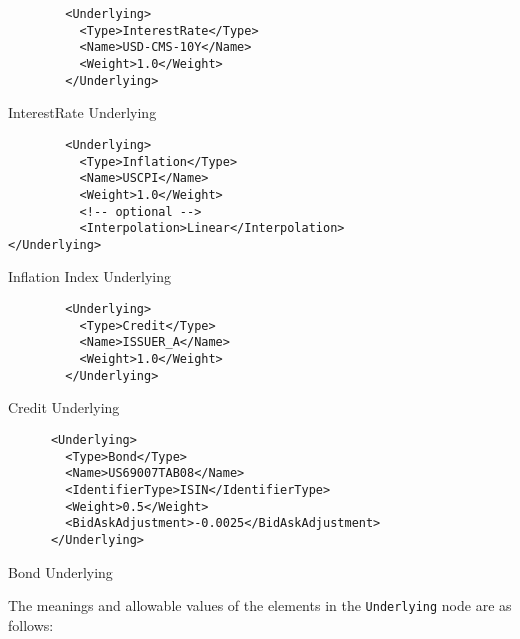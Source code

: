 \begin{listing}[H]
\begin{verbatim}
        <Underlying>
          <Type>InterestRate</Type>
          <Name>USD-CMS-10Y</Name>
          <Weight>1.0</Weight>
        </Underlying>
\end{verbatim}
\caption{InterestRate Underlying}
\label{lst:irunderlying}
\end{listing}

\begin{listing}[H]
\begin{verbatim}
        <Underlying>
          <Type>Inflation</Type>
          <Name>USCPI</Name>
          <Weight>1.0</Weight>
          <!-- optional -->
          <Interpolation>Linear</Interpolation>
</Underlying>
\end{verbatim}
\caption{Inflation Index Underlying}
\label{lst:infunderlying}
\end{listing}

\begin{listing}[H]
\begin{verbatim}
        <Underlying>
          <Type>Credit</Type>
          <Name>ISSUER_A</Name>
          <Weight>1.0</Weight>
        </Underlying>
\end{verbatim}
\caption{Credit Underlying}
\label{lst:crunderlying}
\end{listing}

\begin{listing}[H]
\begin{verbatim}
      <Underlying>
        <Type>Bond</Type>
        <Name>US69007TAB08</Name>
        <IdentifierType>ISIN</IdentifierType>
        <Weight>0.5</Weight>
        <BidAskAdjustment>-0.0025</BidAskAdjustment>
      </Underlying>
\end{verbatim}
\caption{Bond Underlying}
\label{lst:bondunderlying}
\end{listing}

The meanings and allowable values of the elements in the \lstinline!Underlying! node are as follows:

